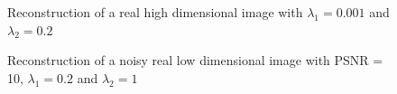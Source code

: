 \documentclass[a4paper,11pt,oneside]{report}
\theoremstyle{named}
\begin{document}
\begin{figure}
    \centering
    \caption{Reconstruction of a real high dimensional image with $\lambda_1 = 0.001$ and $\lambda_2 = 0.2$}
    \label{fig:h4}
\end{figure}

\begin{figure}
    \centering
    \caption{Reconstruction of a noisy real low dimensional image with PSNR = 10, $\lambda_1 = 0.2$ and $\lambda_2 = 1$}
    \label{fig:h1n}
\end{figure}
\end{document}

